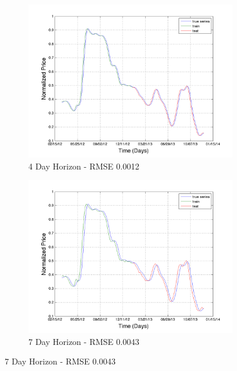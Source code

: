 \begin{figure}
        \centering
        \begin{subfigure}[b]{0.5\textwidth}
                \includegraphics[width=\textwidth]{img/model/wheat/pred_4}
                \caption{4 Day Horizon - RMSE 0.0012 }
                \label{fig:gull}
        \end{subfigure}%
        \begin{subfigure}[b]{0.5\textwidth}
                \includegraphics[width=\textwidth]{img/model/wheat/pred_7}
                \caption{7 Day Horizon - RMSE 0.0043}
                \label{fig:tiger}
        \end{subfigure}
       

\end{figure}
